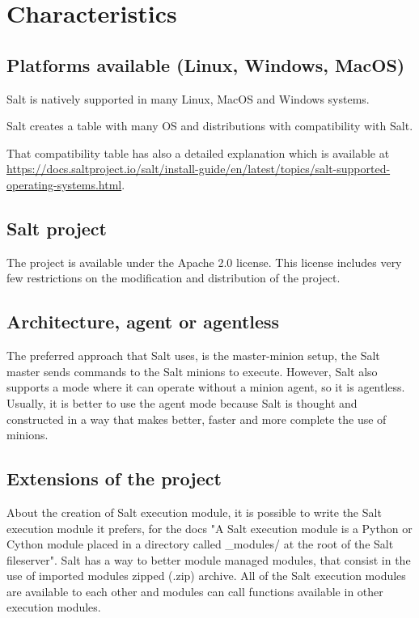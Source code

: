 \documentclass[12pt,a4paper,openright,twoside]{book}
\begin{document}
\section{Characteristics}

\subsection{Platforms available (Linux, Windows, MacOS)}
Salt is natively supported in many Linux, MacOS and Windows systems.


Salt creates a table with many OS and distributions with compatibility with Salt.

That compatibility table has also a detailed explanation which is available at \url{https://docs.saltproject.io/salt/install-guide/en/latest/topics/salt-supported-operating-systems.html}.

\subsection{Salt project}
The project is available under the Apache 2.0 license. This license includes very few restrictions on the modification and distribution of the project.

\subsection{Architecture, agent or agentless}
The preferred approach that Salt uses, is the master-minion setup, the Salt master sends commands to the Salt minions to execute.
However, Salt also supports a mode where it can operate without a minion agent, so it is agentless.
Usually, it is better to use the agent mode because Salt is thought and constructed in a way that makes better, faster and more complete the use of minions.

\subsection{Extensions of the project}
About the creation of Salt execution module, it is possible to write the Salt execution module it prefers,
for the docs "A Salt execution module is a Python or Cython module
placed in a directory called \_modules/ at the root of the Salt fileserver".\cite{saltDocModules}
Salt has a way to better module managed modules, that consist in the use of imported modules zipped (.zip) archive.
All of the Salt execution modules are available to each other and modules can call functions available in other execution modules.
\end{document}
